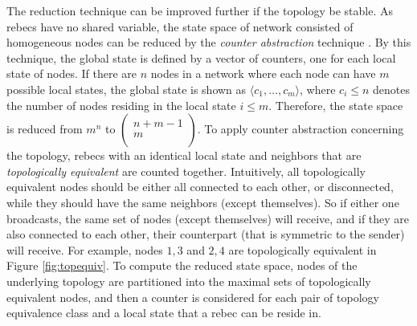 The reduction technique can be improved further if the topology be stable. As rebecs have no shared variable, the state space of network consisted of homogeneous nodes can be reduced by the \emph{counter abstraction} technique \cite{emerson1999asymmetry}. By this technique, the global state is defined by a vector of counters, one for each local state of nodes. If there are $n$ nodes in a network where each node can have $m$ possible local states, the global state is shown as $\langle c_1,\ldots,c_m \rangle $, where $c_i\le n$ denotes the number of nodes residing in the local state $i\le m$. Therefore, the state space is reduced from $m^n$ to $\begin{pmatrix}
n+m-1 \\
m \\
\end{pmatrix}$. To apply
counter abstraction concerning the topology, rebecs with an identical local state and
neighbors that are \textit{topologically equivalent} are counted together. Intuitively, all topologically equivalent nodes should be either all connected to each other, or disconnected, while they should have the same neighbors (except themselves). So if either one broadcasts, the same set of nodes (except themselves) will receive, and if they are also connected to each other, their counterpart (that is symmetric to the sender) will receive. For example, nodes $1,3$ and $2,4$ are topologically equivalent in Figure \ref{fig:topequiv}. To compute the reduced state space, nodes of the underlying topology are partitioned into the maximal sets of topologically equivalent nodes, and then a counter is considered for each pair of topology equivalence class and a local state that a rebec can be reside in. %


